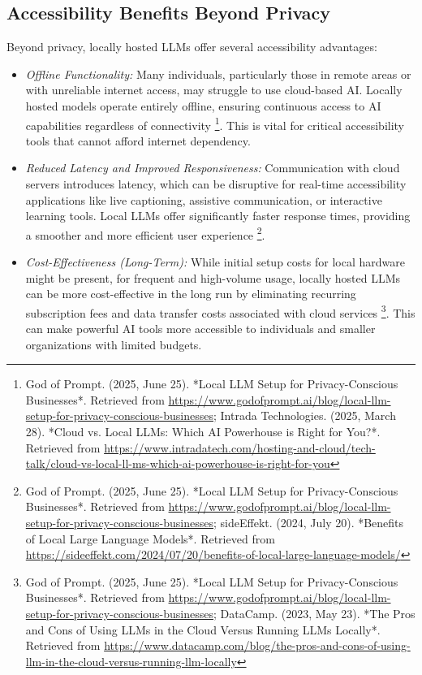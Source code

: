 \subsection{Accessibility Benefits Beyond Privacy}
Beyond privacy, locally hosted LLMs offer several accessibility advantages:
\begin{itemize}
    \item \emph{Offline Functionality:} Many individuals, particularly those in remote areas or with unreliable internet access, may struggle to use cloud-based AI. Locally hosted models operate entirely offline, ensuring continuous access to AI capabilities regardless of connectivity \footnote{God of Prompt. (2025, June 25). *Local LLM Setup for Privacy-Conscious Businesses*. Retrieved from \url{https://www.godofprompt.ai/blog/local-llm-setup-for-privacy-conscious-businesses}; Intrada Technologies. (2025, March 28). *Cloud vs. Local LLMs: Which AI Powerhouse is Right for You?*. Retrieved from \url{https://www.intradatech.com/hosting-and-cloud/tech-talk/cloud-vs-local-ll-ms-which-ai-powerhouse-is-right-for-you}}. This is vital for critical accessibility tools that cannot afford internet dependency.
    \item \emph{Reduced Latency and Improved Responsiveness:} Communication with cloud servers introduces latency, which can be disruptive for real-time accessibility applications like live captioning, assistive communication, or interactive learning tools. Local LLMs offer significantly faster response times, providing a smoother and more efficient user experience \footnote{God of Prompt. (2025, June 25). *Local LLM Setup for Privacy-Conscious Businesses*. Retrieved from \url{https://www.godofprompt.ai/blog/local-llm-setup-for-privacy-conscious-businesses}; sideEffekt. (2024, July 20). *Benefits of Local Large Language Models*. Retrieved from \url{https://sideeffekt.com/2024/07/20/benefits-of-local-large-language-models/}}.
    \item \emph{Cost-Effectiveness (Long-Term):} While initial setup costs for local hardware might be present, for frequent and high-volume usage, locally hosted LLMs can be more cost-effective in the long run by eliminating recurring subscription fees and data transfer costs associated with cloud services \footnote{God of Prompt. (2025, June 25). *Local LLM Setup for Privacy-Conscious Businesses*. Retrieved from \url{https://www.godofprompt.ai/blog/local-llm-setup-for-privacy-conscious-businesses}; DataCamp. (2023, May 23). *The Pros and Cons of Using LLMs in the Cloud Versus Running LLMs Locally*. Retrieved from \url{https://www.datacamp.com/blog/the-pros-and-cons-of-using-llm-in-the-cloud-versus-running-llm-locally}}. This can make powerful AI tools more accessible to individuals and smaller organizations with limited budgets.

\end{itemize}
